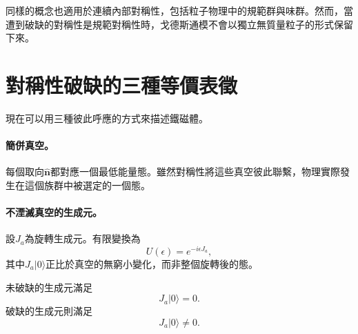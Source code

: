 
同樣的概念也適用於連續內部對稱性，包括粒子物理中的規範群與味群。然而，當遭到破缺的對稱性是規範對稱性時，戈德斯通模不會以獨立無質量粒子的形式保留下來。

\begin{classroomqa}
\end{classroomqa}

\section{對稱性破缺的三種等價表徵}

現在可以用三種彼此呼應的方式來描述鐵磁體。

\paragraph{簡併真空。}
每個取向\(\hat{\mathbf n}\)都對應一個最低能量態。雖然對稱性將這些真空彼此聯繫，物理實際發生在這個族群中被選定的一個態。

\paragraph{不湮滅真空的生成元。}
設\(J_a\)為旋轉生成元。有限變換為
\begin{equation}
U(\epsilon)=e^{-i\epsilon J_a},
\end{equation}
其中\(J_a|0\rangle\)正比於真空的無窮小變化，而非整個旋轉後的態。

\begin{classroomqa}
\end{classroomqa}

未破缺的生成元滿足
\begin{equation}
J_a|0\rangle=0.
\label{eq:l9-unbroken-generator}
\end{equation}
破缺的生成元則滿足
\begin{equation}
J_a|0\rangle\neq0.
\label{eq:l9-broken-generator}
\end{equation}

